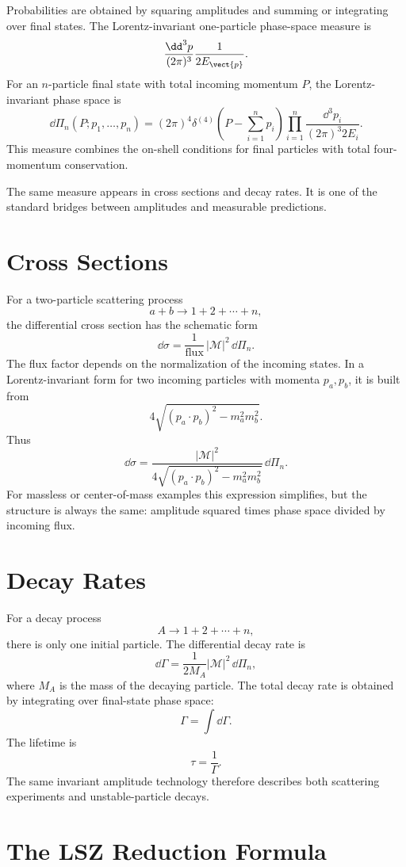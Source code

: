 Probabilities are obtained by squaring amplitudes and summing or integrating
over final states. The Lorentz-invariant one-particle phase-space measure is
\[
    \frac{\dd^3p}{(2\pi)^3}\frac{1}{2E_{\vect{p}}}.
\]
For an \(n\)-particle final state with total incoming momentum \(P\), the
Lorentz-invariant phase space is
\[
    \dd\Pi_n(P;p_1,\ldots,p_n)
    = (2\pi)^4\delta^{(4)}\left(P-\sum_{i=1}^{n}p_i\right)
      \prod_{i=1}^{n}\frac{\dd^3p_i}{(2\pi)^3 2E_i}.
\]
This measure combines the on-shell conditions for final particles with total
four-momentum conservation.

The same measure appears in cross sections and decay rates. It is one of the
standard bridges between amplitudes and measurable predictions.

\section{Cross Sections}

For a two-particle scattering process
\[
    a+b\longrightarrow 1+2+\cdots+n,
\]
the differential cross section has the schematic form
\[
    \dd\sigma
    = \frac{1}{\text{flux}}\,|\mathcal{M}|^2\,\dd\Pi_n.
\]
The flux factor depends on the normalization of the incoming states. In a
Lorentz-invariant form for two incoming particles with momenta \(p_a,p_b\), it
is built from
\[
    4\sqrt{(p_a\cdot p_b)^2-m_a^2m_b^2}.
\]
Thus
\[
    \dd\sigma
    = \frac{|\mathcal{M}|^2}{4\sqrt{(p_a\cdot p_b)^2-m_a^2m_b^2}}\,\dd\Pi_n.
\]
For massless or center-of-mass examples this expression simplifies, but the
structure is always the same: amplitude squared times phase space divided by
incoming flux.

\section{Decay Rates}

For a decay process
\[
    A\longrightarrow 1+2+\cdots+n,
\]
there is only one initial particle. The differential decay rate is
\[
    \dd\Gamma
    = \frac{1}{2M_A}|\mathcal{M}|^2\,\dd\Pi_n,
\]
where \(M_A\) is the mass of the decaying particle. The total decay rate is
obtained by integrating over final-state phase space:
\[
    \Gamma = \int \dd\Gamma.
\]
The lifetime is
\[
    \tau = \frac{1}{\Gamma}.
\]
The same invariant amplitude technology therefore describes both scattering
experiments and unstable-particle decays.

\section{The LSZ Reduction Formula}

